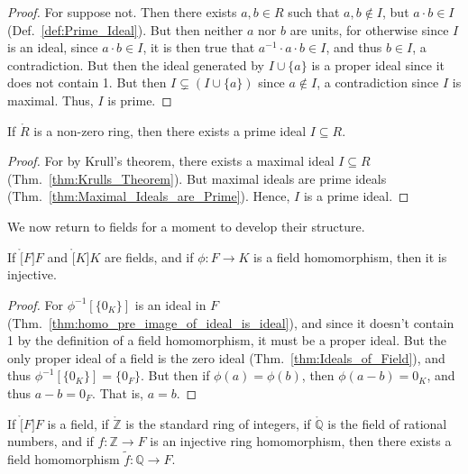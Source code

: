     \begin{proof}
        For suppose not. Then there exists $a,b\in{R}$ such that
        $a,b\notin{I}$, but $a\cdot{b}\in{I}$ (Def.~\ref{def:Prime_Ideal}).
        But then neither $a$ nor $b$ are units, for otherwise since $I$ is
        an ideal, since $a\cdot{b}\in{I}$, it is then true that
        $a^{\minus{1}}\cdot{a}\cdot{b}\in{I}$, and thus $b\in{I}$, a
        contradiction. But then the ideal generated by $I\cup\{a\}$ is a
        proper ideal since it does not contain 1. But then
        $I\subsetneq(I\cup\{a\})$ since $a\notin{I}$, a contradiction since
        $I$ is maximal. Thus, $I$ is prime.
    \end{proof}
    \begin{theorem}
        \label{thm:Existence_of_Prime_Ideals}%
        If $\ring{R}$ is a non-zero ring, then there exists a prime ideal
        $I\subseteq{R}$.
    \end{theorem}
    \begin{proof}
        For by Krull's theorem, there exists a maximal ideal
        $I\subseteq{R}$ (Thm.~\ref{thm:Krulls_Theorem}). But maximal ideals
        are prime ideals (Thm.~\ref{thm:Maximal_Ideals_are_Prime}). Hence,
        $I$ is a prime ideal.
    \end{proof}
    We now return to fields for a moment to develop their structure.
    \begin{theorem}
        If $\ring[F]{F}$ and $\ring[K]{K}$ are fields, and if
        $\phi:F\rightarrow{K}$ is a field homomorphism, then it is
        injective.
    \end{theorem}
    \begin{proof}
        For $\phi^{\minus{1}}[\{0_{K}\}]$ is an ideal in $F$
        (Thm.~\ref{thm:homo_pre_image_of_ideal_is_ideal}), and since it
        doesn't contain 1 by the definition of a field homomorphism, it
        must be a proper ideal. But the only proper ideal of a field is the
        zero ideal (Thm.~\ref{thm:Ideals_of_Field}), and thus
        $\phi^{\minus{1}}[\{0_{K}\}]=\{0_{F}\}$. But then if
        $\phi(a)=\phi(b)$, then $\phi(a-b)=0_{K}$, and thus $a-b=0_{F}$.
        That is, $a=b$.
    \end{proof}
    \begin{theorem}
        If $\ring[F]{F}$ is a field, if $\ring{\mathbb{Z}}$ is the standard
        ring of integers, if $\ring{\mathbb{Q}}$ is the field of
        rational numbers, and if $f:\mathbb{Z}\rightarrow{F}$ is an
        injective ring homomorphism, then there exists a field homomorphism
        $\tilde{f}:\mathbb{Q}\rightarrow{F}$.
    \end{theorem}
